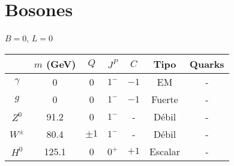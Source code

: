 \documentclass[10pt,twocolumn]{article}
\begin{document}
\section*{Bosones}
$B = 0$, $L = 0$

\begin{supertabular}{|c|c|c|c|c|c|c|}
\hline
 & $m$ (GeV) & $Q$ & $J^P$ & $C$ & Tipo & Quarks \\
\hline
$\gamma$ & 0 & 0 & $1^-$ & $-1$ & EM & - \\
$g$ & 0 & 0 & $1^-$ & $-1$ & Fuerte & - \\
$Z^0$ & 91.2 & 0 & $1^-$ & - & Débil & - \\
$W^\pm$ & 80.4 & $\pm1$ & $1^-$ & - & Débil & - \\
$H^0$ & 125.1 & 0 & $0^+$ & $+1$ & Escalar & - \\
\hline
\end{supertabular}
\end{document}
